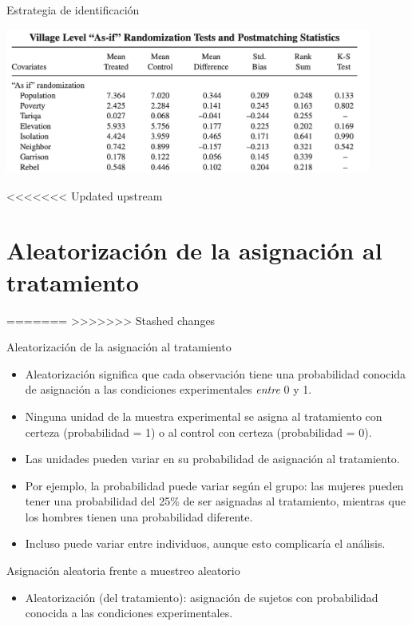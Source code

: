 \documentclass[
  ignorenonframetext,
]{beamer}
\begin{document}
\begin{frame}{Estrategia de identificación}
\begin{frame}{}
\protect\hypertarget{section-4}{}
\includegraphics[width=0.9\textwidth,height=\textheight]{figs/lyall20093.png}
\end{frame}
<<<<<<< Updated upstream

\hypertarget{aleatorizaciuxf3n-de-la-asignaciuxf3n-al-tratamiento}{%
\section{Aleatorización de la asignación al
tratamiento}\label{aleatorizaciuxf3n-de-la-asignaciuxf3n-al-tratamiento}}
=======
>>>>>>> Stashed changes

\begin{frame}{Aleatorización de la asignación al tratamiento}
\protect\hypertarget{aleatorizaciuxf3n-de-la-asignaciuxf3n-al-tratamiento-1}{}
\begin{itemize}
\item
  Aleatorización significa que cada observación tiene una probabilidad
  conocida de asignación a las condiciones experimentales \emph{entre} 0
  y 1.
\item
  Ninguna unidad de la muestra experimental se asigna al tratamiento con
  certeza (probabilidad = 1) o al control con certeza (probabilidad =
  0).
\item
  Las unidades pueden variar en su probabilidad de asignación al
  tratamiento.
\item
  Por ejemplo, la probabilidad puede variar según el grupo: las mujeres
  pueden tener una probabilidad del 25\% de ser asignadas al
  tratamiento, mientras que los hombres tienen una probabilidad
  diferente.
\item
  Incluso puede variar entre individuos, aunque esto complicaría el
  análisis.
\end{itemize}
\end{frame}

\begin{frame}{Asignación aleatoria frente a muestreo aleatorio}
\protect\hypertarget{asignaciuxf3n-aleatoria-frente-a-muestreo-aleatorio}{}
\begin{itemize}
\item
  Aleatorización (del tratamiento): asignación de sujetos con
  probabilidad conocida a las condiciones experimentales.


\end{itemize}
\end{frame}
\end{frame}
\end{document}
